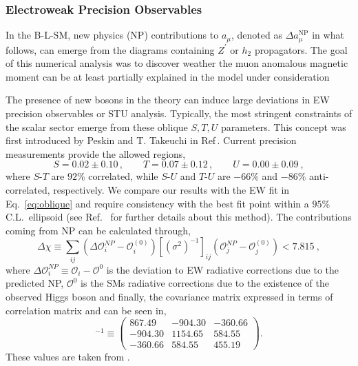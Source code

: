 \documentclass[10pt]{report}
\newcommand{\ro}[1]{\textrm{#1}}
\begin{document}
\subsubsection{Electroweak Precision Observables}
\label{Sec:B-L-SM-EW}

In the B-L-SM, new physics (NP) contributions to $a_\mu$, denoted as $\Delta a_\mu^{\ro{NP}}$ in what follows, can emerge from the diagrams containing $Z^\prime$ or $h_2$ propagators. The goal of this numerical analysis was to discover weather the muon anomalous magnetic moment can be at least partially explained in the model under consideration

The presence of new bosons in the theory can induce large deviations in EW precision observables or STU analysis. Typically, the most stringent constraints of the scalar sector emerge from these oblique $S,T,U$ parameters. This concept was first introduced by Peskin and T. Takeuchi in Ref\,\cite{Peskin1992}. Current precision measurements provide the allowed regions,
%
\begin{equation}
S = 0.02 \pm 0.10\,, \qquad T = 0.07 \pm 0.12\,, \qquad U = 0.00 \pm 0.09 \ ,
\label{eq:oblique}
\end{equation}
%
where $S$-$T$ are $92\%$ correlated, while $S$-$U$ and $T$-$U$ are $-66\%$ and $-86\%$ anti-correlated, respectively.
%
We compare our results with the EW fit in Eq.~\eqref{eq:oblique} and require consistency with the best fit point within a $95\%$ C.L.~ellipsoid (see Ref.~\cite{Costa:2014qga} for further details about this method). %
%
The contributions coming from NP can be calculated through,
%
\begin{equation}
\Delta \chi \equiv \sum_{ij}  \left(  \Delta \mathcal{O}_{i}^{NP} - \mathcal{O}_{i}^{(0)} \right) [ ( \sigma^2 )^{-1} ]_{ij}  \left(  \mathcal{O}_{j}^{NP} - \mathcal{O}_{j}^{(0)}  \right) < 7.815 \ , 
\end{equation}
%
where $\Delta \mathcal{O}_i^{NP} \equiv \mathcal{O}_i - \mathcal{O}^{0}$ is the deviation to EW radiative corrections due to the predicted NP, $\mathcal{O}^{0}$ is the SMs radiative corrections due to the existence of the observed Higgs boson and finally, the covariance matrix expressed in terms of correlation matrix and can be seen in, 
\begin{equation}
[ \sigma^2 ]^{-1} \equiv \begin{pmatrix}
867.49 & -904.30 & -360.66\\
-904.30 & 1154.65 & 584.55 \\
-360.66 & 584.55 &  455.19
\end{pmatrix} . 
\end{equation}
These values are taken from \cite{Baak_2012}.
\end{document}
